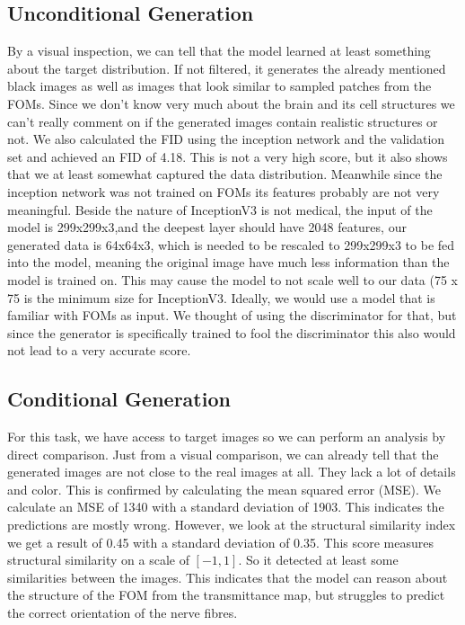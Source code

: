\documentclass[12pt]{article}
\begin{document}
\subsection{Unconditional Generation}
By a visual inspection, we can tell that the model learned at least something about the target distribution. If not filtered, it generates the already mentioned black images as well as images that look similar to sampled patches from the FOMs. Since we don't know very much about the brain and its cell structures we can't really comment on if the generated images contain realistic structures or not. We also calculated the FID using the inception network and the validation set and achieved an FID of 4.18. This is not a very high score, but it also shows that we at least somewhat captured the data distribution. Meanwhile since the inception network was not trained on FOMs its features probably are not very meaningful. Beside the nature of InceptionV3 is not medical, the input of the model is 299x299x3,and the deepest layer should have 2048 features, our generated data is 64x64x3, which is needed to be rescaled to 299x299x3 to be fed into the model, meaning the original image have much less information than the model is trained on. This may cause the model to not scale well to our data (75 x 75 is the minimum size for InceptionV3. Ideally, we would use a model that is familiar with FOMs as input. We thought of using the discriminator for that, but since the generator is specifically trained to fool the discriminator this also would not lead to a very accurate score.
\subsection{Conditional Generation}
For this task, we have access to target images so we can perform an analysis by direct comparison. Just from a visual comparison, we can already tell that the generated images are not close to the real images at all. They lack a lot of details and color. This is confirmed by calculating the mean squared error (MSE). We calculate an MSE of 1340 with a standard deviation of 1903. This indicates the predictions are mostly wrong. However, we look at the structural similarity index we get a result of 0.45 with a standard deviation of 0.35. This score measures structural similarity on a scale of $[-1, 1]$. So it detected at least some similarities between the images. This indicates that the model can reason about the structure of the FOM from the transmittance map, but struggles to predict the correct orientation of the nerve fibres.
%
\end{document}
